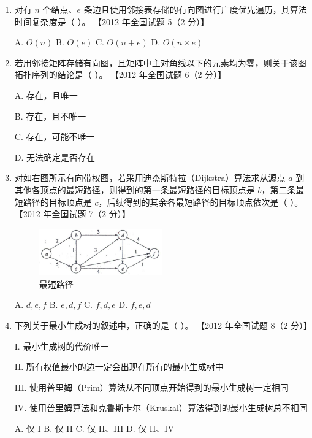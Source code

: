 \documentclass[lang=cn,newtx,10pt,scheme=chinese]{../../elegantbook}
\begin{document}
\begin{enumerate}
        \item 对有 $n$ 个结点、$e$ 条边且使用邻接表存储的有向图进行广度优先遍历，其算法时间复杂度是（ ）。  
        【2012 年全国试题 5（2 分）】  

        A. $O(n)$ \quad B. $O(e)$ \quad C. $O(n + e)$ \quad D. $O(n \times e)$  
    
        \item 若用邻接矩阵存储有向图，且矩阵中主对角线以下的元素均为零，则关于该图拓扑序列的结论是（ ）。  
        【2012 年全国试题 6（2 分）】  

        A. 存在，且唯一  

        B. 存在，且不唯一  

        C. 存在，可能不唯一  

        D. 无法确定是否存在  
    
        \item 对如右图所示有向带权图，若采用迪杰斯特拉（Dijkstra）算法求从源点 $a$ 到其他各顶点的最短路径，则得到的第一条最短路径的目标顶点是 $b$，第二条最短路径的目标顶点是 $c$，后续得到的其余各最短路径的目标顶点依次是（ ）。  
        【2012 年全国试题 7（2 分）】  

        \begin{figure}[h!]
            \centering
            \includegraphics[width=0.5\textwidth]{../../figure/exercisePicPDF/chapter7/7-14.pdf}
            \caption{最短路径}
    \end{figure}
        A. $d,e,f$ \quad B. $e, d, f$ \quad C. $f,d, e$ \quad D. $f,e,d$  
    
        \item 下列关于最小生成树的叙述中，正确的是（ ）。  
        【2012 年全国试题 8（2 分）】  

        I. 最小生成树的代价唯一  

        II. 所有权值最小的边一定会出现在所有的最小生成树中 

        III. 使用普里姆（Prim）算法从不同顶点开始得到的最小生成树一定相同  

        IV. 使用普里姆算法和克鲁斯卡尔（Kruskal）算法得到的最小生成树总不相同  

        A. 仅 I \quad B. 仅 II \quad C. 仅 II、III \quad D. 仅 II、IV  
    

\end{enumerate}
\end{document}
